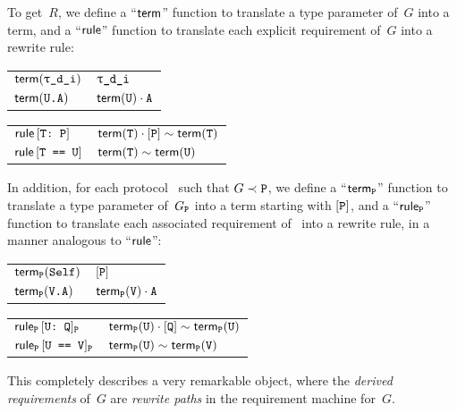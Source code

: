\documentclass[../generics]{subfiles}
\begin{document}
To get~$R$, we define a ``$\mathsf{term}$'' function to translate a type parameter of~$G$ into a term, and a ``$\mathsf{rule}$'' function to translate each explicit requirement of~$G$ into a rewrite rule:
\begin{center}
\begin{tabular}{l@{ $:=$ }l}
\toprule
$\Term(\ttgp{d}{i})$&$\ttgp{d}{i}$\\
$\mathsf{term}(\texttt{U.A})$&$\mathsf{term}(\texttt{U})\cdot\texttt{A}$\\
\bottomrule
\end{tabular}
\qquad
\begin{tabular}{l@{ $:=$ }l}
\toprule
\index{conformance requirement!in requirement machine}$\mathsf{rule}\, [\texttt{T:~P}]$&$\mathsf{term}(\texttt{T})\cdot[\texttt{P}]\sim\mathsf{term}(\texttt{T})$\\
\index{same-type requirement!in requirement machine}$\mathsf{rule}\, [\texttt{T == U}]$&$\mathsf{term}(\texttt{T})\sim\mathsf{term}(\texttt{U})$\\
\bottomrule
\end{tabular}
\end{center}
In addition, for each protocol \tP\ such that $G\prec\texttt{P}$, we define a ``$\mathsf{term}_{\texttt{P}}$'' function to translate a type parameter of~$G_{\texttt{P}}$ into a term starting with $[\texttt{P}]$, and a ``$\mathsf{rule}_{\texttt{P}}$'' function to translate each associated requirement of \tP\ into a rewrite rule, in a manner analogous to ``$\mathsf{rule}$'':
\begin{center}
\begin{tabular}{l@{ $:=$ }l}
\toprule
$\mathsf{term}_{\texttt{P}}(\texttt{Self})$&$[\texttt{P}]$\\
$\mathsf{term}_{\texttt{P}}(\texttt{V.A})$&$\mathsf{term}_{\texttt{P}}(\texttt{V})\cdot\texttt{A}$\\
\bottomrule
\end{tabular}
\qquad
\begin{tabular}{l@{ $:=$ }l}
\toprule
\index{associated conformance requirement!in requirement machine}$\mathsf{rule}_{\texttt{P}}\, [\texttt{U:~Q}]_{\texttt{P}}$&$\mathsf{term}_{\texttt{P}}(\texttt{U})\cdot[\texttt{Q}]\sim\mathsf{term}_{\texttt{P}}(\texttt{U})$\\
\index{associated same-type requirement!in requirement machine}$\mathsf{rule}_{\texttt{P}}\, [\texttt{U == V}]_{\texttt{P}}$&$\mathsf{term}_{\texttt{P}}(\texttt{U})\sim\mathsf{term}_{\texttt{P}}(\texttt{V})$\\
\bottomrule
\end{tabular}
\end{center}
This completely describes a very remarkable object, where the \emph{derived requirements} of~$G$ are \emph{rewrite paths} in the requirement machine for~$G$.
\end{document}

